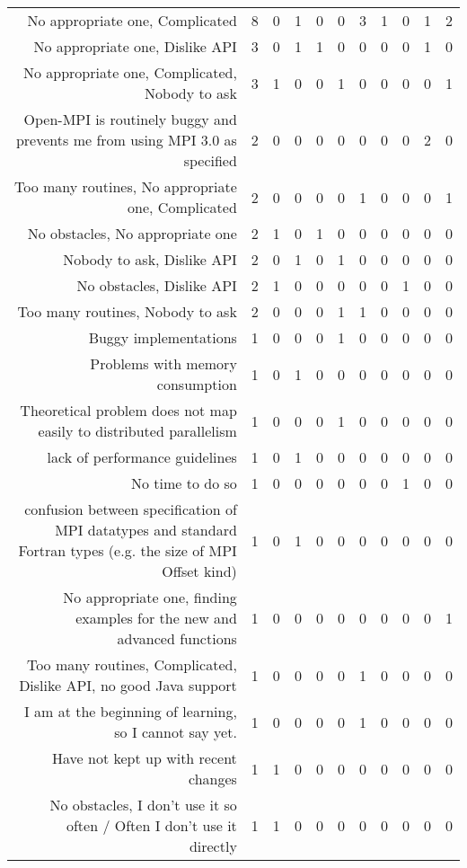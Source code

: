 {\begin{landscape}
\begin{longtable}[htb]{r|c|c|c|c|c|c|c|c|c|c}
{No appropriate one, Complicated} & 8 & 0 & 1 & 0 & 0 & 3 & 1 & 0 & 1 & 2 \\%
{No appropriate one, Dislike API} & 3 & 0 & 1 & 1 & 0 & 0 & 0 & 0 & 1 & 0 \\%
{No appropriate one, Complicated, Nobody to ask} & 3 & 1 & 0 & 0 & 1 & 0 & 0 & 0 & 0 & 1 \\%
{Open-MPI is routinely buggy and prevents me from using MPI 3.0 as specified} & 2 & 0 & 0 & 0 & 0 & 0 & 0 & 0 & 2 & 0 \\%
{Too many routines, No appropriate one, Complicated} & 2 & 0 & 0 & 0 & 0 & 1 & 0 & 0 & 0 & 1 \\%
{No obstacles, No appropriate one} & 2 & 1 & 0 & 1 & 0 & 0 & 0 & 0 & 0 & 0 \\%
{Nobody to ask, Dislike API} & 2 & 0 & 1 & 0 & 1 & 0 & 0 & 0 & 0 & 0 \\%
{No obstacles, Dislike API} & 2 & 1 & 0 & 0 & 0 & 0 & 0 & 1 & 0 & 0 \\%
{Too many routines, Nobody to ask} & 2 & 0 & 0 & 0 & 1 & 1 & 0 & 0 & 0 & 0 \\%
{Buggy implementations} & 1 & 0 & 0 & 0 & 1 & 0 & 0 & 0 & 0 & 0 \\%
{Problems with memory consumption} & 1 & 0 & 1 & 0 & 0 & 0 & 0 & 0 & 0 & 0 \\%
{Theoretical problem does not map easily to distributed parallelism} & 1 & 0 & 0 & 0 & 1 & 0 & 0 & 0 & 0 & 0 \\%
{lack of performance guidelines} & 1 & 0 & 1 & 0 & 0 & 0 & 0 & 0 & 0 & 0 \\%
{No time to do so} & 1 & 0 & 0 & 0 & 0 & 0 & 0 & 1 & 0 & 0 \\%
{confusion between specification of MPI datatypes and standard Fortran types (e.g. the size of MPI Offset kind)} & 1 & 0 & 1 & 0 & 0 & 0 & 0 & 0 & 0 & 0 \\%
{No appropriate one, finding examples for the new and advanced functions} & 1 & 0 & 0 & 0 & 0 & 0 & 0 & 0 & 0 & 1 \\%
{Too many routines, Complicated, Dislike API, no good Java support} & 1 & 0 & 0 & 0 & 0 & 1 & 0 & 0 & 0 & 0 \\%
{I am at the beginning of learning, so I cannot say yet.} & 1 & 0 & 0 & 0 & 0 & 1 & 0 & 0 & 0 & 0 \\%
{Have not kept up with recent changes} & 1 & 1 & 0 & 0 & 0 & 0 & 0 & 0 & 0 & 0 \\%
{No obstacles, I don't use it so often / Often I don't use it directly} & 1 & 1 & 0 & 0 & 0 & 0 & 0 & 0 & 0 & 0 \\%

\end{longtable}
\end{landscape}}
